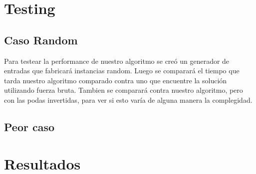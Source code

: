 \section{Testing}
\subsection{Caso Random}
Para testear la performance de nuestro algoritmo se cre\'o un generador de entradas que fabricar\'a instancias random. Luego se comparar\'a el tiempo que tarda nuestro algoritmo comparado contra uno que encuentre la soluci\'on utilizando fuerza bruta. Tambien se comparar\'a contra nuestro algoritmo, pero con las podas invertidas, para ver si esto var\'ia de alguna manera la complegidad.
\\



\subsection{Peor caso}



\newpage
\section{Resultados}